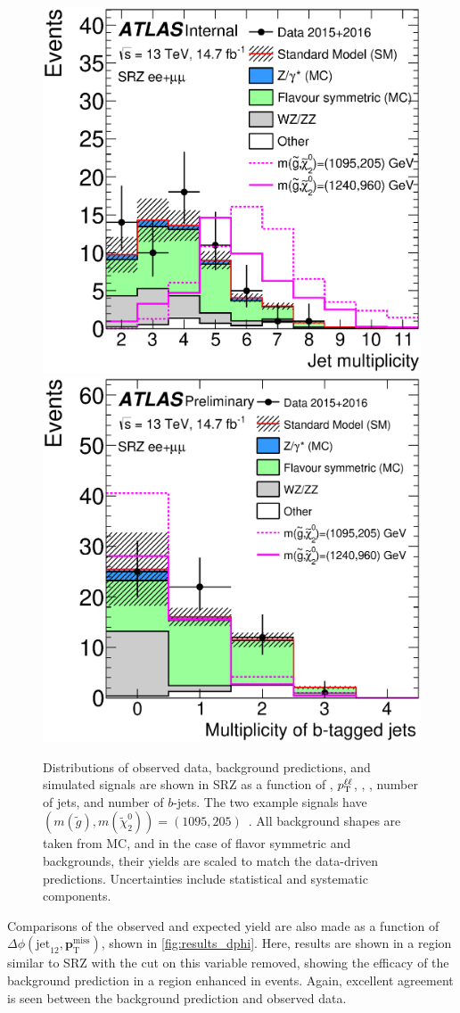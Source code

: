 \begin{centering}
\begin{figure}[!hbt]
\includegraphics[width=.48\linewidth]{figures/results/njets_ee_mm_srz_R_a.eps}
\includegraphics[width=.48\linewidth]{figures/results/nbjets_ee_mm_srz_R_a.eps}
\caption{ Distributions of observed data, background predictions, and simulated signals are shown in SRZ as a function of \mll, $p_{\text{T}}^{\ell\ell}$, \met, \HT, number of jets, and number of $b$-jets. The two example signals have $(m(\tilde{g}),m(\tilde{\chi}^{0}_{2}))=(1095, 205)$~\GeV. All background shapes are taken from \ac{MC}, and in the case of flavor symmetric and \dyjets backgrounds, their yields are scaled to match the data-driven predictions. Uncertainties include statistical and systematic components.}
\label{fig:results_srdists}
\end{figure}
\end{centering}

Comparisons of the observed and expected yield are also made as a function of $\Delta\phi(\text{jet}_{12},{\boldsymbol p}_{\mathrm{T}}^\mathrm{miss})$, shown in \autoref{fig:results_dphi}. Here, results are shown in a region similar to SRZ with the cut on this variable removed, showing the efficacy of the background prediction in a region enhanced in \dyjets events. Again, excellent agreement is seen between the background prediction and observed data.


